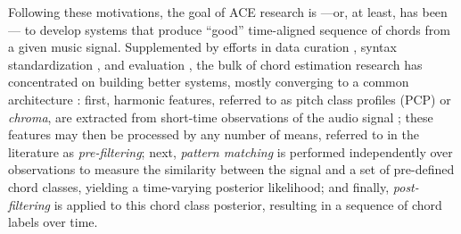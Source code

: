 \documentclass{article}
\begin{document}
Following these motivations, the goal of ACE research is ---or, at least, has been--- to develop systems that produce ``good'' time-aligned sequence of chords from a given music signal.
Supplemented by efforts in data curation \cite{Burgoyne2011Expert}, syntax standardization \cite{Harte2005Symbolic}, and evaluation \cite{Pauwels2013Evaluating}, the bulk of chord estimation research has concentrated on building better systems, mostly converging to a common architecture \cite{Cho2014Improved}:
first, harmonic features, referred to as pitch class profiles (PCP) or \emph{chroma}, are extracted from short-time observations of the audio signal \cite{Fujishima1999Realtime};
these features may then be processed by any number of means, referred to in the literature as \emph{pre-filtering};
next, \emph{pattern matching} is performed independently over observations to measure the similarity between the signal and a set of pre-defined chord classes, yielding a time-varying posterior likelihood;
and finally, \emph{post-filtering} is applied to this chord class posterior, resulting in a sequence of chord labels over time.


\end{document}
